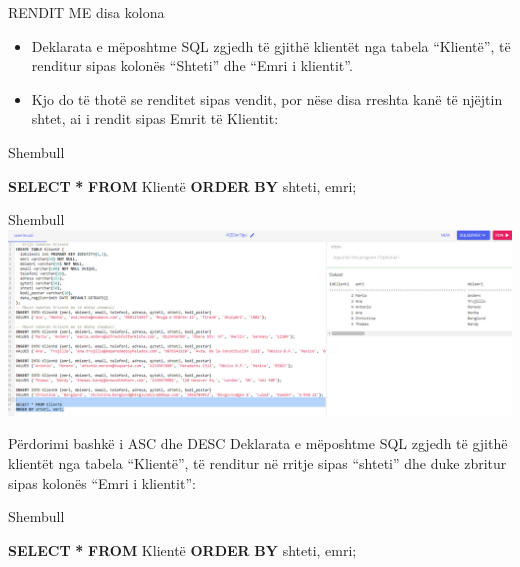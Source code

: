 \documentclass[
  ignorenonframetext,
]{beamer}
\newenvironment{Shaded}{\begin{snugshade}}{\end{snugshade}}
\newcommand{\KeywordTok}[1]{\textcolor[rgb]{0.13,0.29,0.53}{\textbf{#1}}}
\newcommand{\NormalTok}[1]{#1}
\newcommand{\OperatorTok}[1]{\textcolor[rgb]{0.81,0.36,0.00}{\textbf{#1}}}
\begin{document}
\begin{frame}{RENDIT ME disa kolona}
\label{rendit-me-disa-kolona}
\begin{itemize}
\item
  Deklarata e mëposhtme SQL zgjedh të gjithë klientët nga tabela
  ``Klientë'', të renditur sipas kolonës ``Shteti'' dhe ``Emri i
  klientit''.
\item
  Kjo do të thotë se renditet sipas vendit, por nëse disa rreshta kanë
  të njëjtin shtet, ai i rendit sipas Emrit të Klientit:
\end{itemize}
\end{frame}

\begin{frame}[fragile]{Shembull}
\label{shembull-17}
\begin{Shaded}
\begin{Highlighting}[]
\KeywordTok{SELECT} \OperatorTok{*} \KeywordTok{FROM}\NormalTok{ Klientë}
\KeywordTok{ORDER} \KeywordTok{BY}\NormalTok{ shteti, emri;}
\end{Highlighting}
\end{Shaded}
\end{frame}

\begin{frame}{Shembull}
\label{shembull-18}
\includegraphics{./Figs/query12.png}
\end{frame}

\begin{frame}{Përdorimi bashkë i ASC dhe DESC}
\label{puxebrdorimi-bashkuxeb-i-asc-dhe-desc}
Deklarata e mëposhtme SQL zgjedh të gjithë klientët nga tabela
``Klientë'', të renditur në rritje sipas ``shteti'' dhe duke zbritur
sipas kolonës ``Emri i klientit'':
\end{frame}

\begin{frame}[fragile]{Shembull}
\label{shembull-19}
\begin{Shaded}
\begin{Highlighting}[]
\KeywordTok{SELECT} \OperatorTok{*} \KeywordTok{FROM}\NormalTok{ Klientë}
\KeywordTok{ORDER} \KeywordTok{BY}\NormalTok{ shteti, emri;}
\end{Highlighting}
\end{Shaded}
\end{frame}
\end{document}
